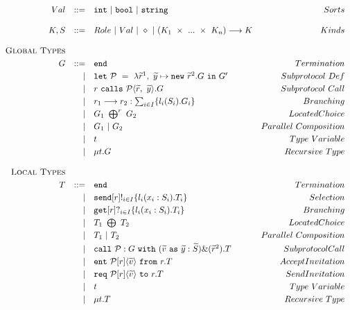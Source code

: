 \documentclass[12pt,twoside]{report}
\begin{document}
\begin{figure}[h]
    \centering
    \begin{equation*}
    \centering
    \begin{array}{rrlr}
        Val & ::= & \texttt{int}\ |\ \texttt{bool}\ |\ \texttt{string} & Sorts\\\\
        K, S & ::= & Role\ |\ Val\ |\ \diamond\ |\ (K_1\ \times\ ...\ \times\ K_n) \longrightarrow K & Kinds\\\\
        
        \textsc{Global\ Types} & & &\\[3pt]
        G & ::= & \texttt{end} & Termination  \\[2.75pt]
             & | & \texttt{let}\ \mathcal{P}\ =\ \lambda\widetilde{r}^1,\ \widetilde{y} \mapsto \texttt{new}\ \widetilde{r}^2.G\ \texttt{in}\ G' & Subprotocol\ Def\\[2.75pt]
             & | & r\ \texttt{calls}\ \mathcal{P}\langle \widetilde{r},\ \widetilde{y}\rangle.G  & Subprotocol\ Call \\[2.75pt]
             & | & r_1 \longrightarrow r_2: \sum_{i \in I}\{l_i( S_i).G_i\} &  Branching \\[2.75pt]
             & | & G_1\ \bigoplus^r\ G_2   & Located Choice \\[2.75pt]
             & | & G_1\ |\ G_2 & Parallel\ Composition \\[2.75pt]
             & | & t & Type\ Variable \\[2.75pt]
             & | & \mu t.G & Recursive\ Type\\\\
             
        \textsc{Local Types} &&& \\[3pt]
        T & ::= & \texttt{end} &  Termination  \\[2.75pt]
          & | & \texttt{send}[r]!_{i \in I}\{ l_i(x_i: S_i).T_i\} & Selection \\[2.75pt]
          & | & \texttt{get}[r]?_{i \in I}\{l_i(x_i:S_i).T_i\} &  Branching \\[2.75pt] 
          & | & T_1\ \bigoplus \ T_2   & Located Choice \\[2.75pt]
          & | & T_1\ |\ T_2 & Parallel\ Composition \\[2.75pt]
          & | & \texttt{call}\ \mathcal{P}:G\ \texttt{with}\ (\widetilde{v}\ \texttt{as}\ \widetilde{y}:\widetilde{S})\&(\widetilde{r}^2).T &  Subprotocol Call \\[2.75pt]
          & | & \texttt{ent}\ \mathcal{P}[r]\langle \widetilde{v} \rangle\ \texttt{from}\ r.T &  Accept Invitation \\[2.75pt]
          & | & \texttt{req}\ \mathcal{P}[r]\langle \widetilde{v} \rangle\ \texttt{to}\ r.T &  Send Invitation \\[2.75pt]
          & | & t &  Type\ Variable \\[2.75pt]
          & | & \mu t.T &  Recursive\ Type
        

\end{array}
\end{equation*}
\end{figure}
\end{document}
